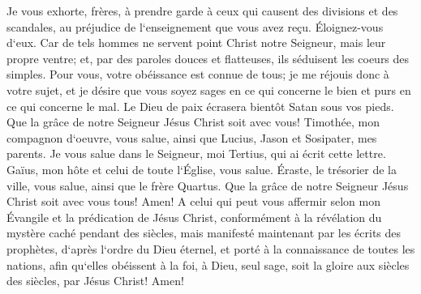\verse Je vous exhorte, frères, à prendre garde à ceux qui causent des divisions et des scandales, au préjudice de l`enseignement que vous avez reçu. Éloignez-vous d`eux. 
\verse Car de tels hommes ne servent point Christ notre Seigneur, mais leur propre ventre; et, par des paroles douces et flatteuses, ils séduisent les coeurs des simples. 
\verse Pour vous, votre obéissance est connue de tous; je me réjouis donc à votre sujet, et je désire que vous soyez sages en ce qui concerne le bien et purs en ce qui concerne le mal. 
\verse Le Dieu de paix écrasera bientôt Satan sous vos pieds. Que la grâce de notre Seigneur Jésus Christ soit avec vous! 
\verse Timothée, mon compagnon d`oeuvre, vous salue, ainsi que Lucius, Jason et Sosipater, mes parents. 
\verse Je vous salue dans le Seigneur, moi Tertius, qui ai écrit cette lettre. 
\verse Gaïus, mon hôte et celui de toute l`Église, vous salue. Éraste, le trésorier de la ville, vous salue, ainsi que le frère Quartus. 
\verse Que la grâce de notre Seigneur Jésus Christ soit avec vous tous! Amen! 
\verse A celui qui peut vous affermir selon mon Évangile et la prédication de Jésus Christ, conformément à la révélation du mystère caché pendant des siècles, 
\verse mais manifesté maintenant par les écrits des prophètes, d`après l`ordre du Dieu éternel, et porté à la connaissance de toutes les nations, afin qu`elles obéissent à la foi, 
\verse à Dieu, seul sage, soit la gloire aux siècles des siècles, par Jésus Christ! Amen! 
